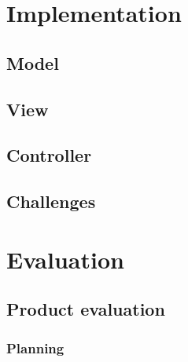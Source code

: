 \documentclass{l4proj}
\begin{document}
\chapter{Implementation}

\section{Model}

\section{View}

\section{Controller}

\section{Challenges}

\chapter{Evaluation}

\section{Product evaluation}

\subsection{Planning}
\end{document}

